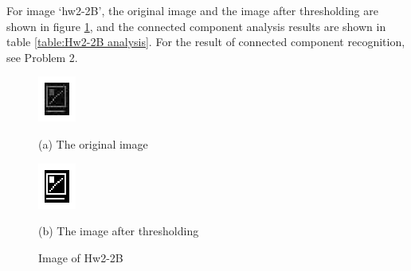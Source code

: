\documentclass[a4paper]{article}
\begin{document}
For image `hw2-2B', the original image and the image after thresholding are shown in figure \ref{figure:Hw2-2B image}, and the connected component analysis results are shown in table \ref{table:Hw2-2B analysis}. For the result of connected component recognition, see Problem 2. 
\begin{figure}[h]
	\begin{minipage}[c]{0.5\linewidth}
		\centering
		\includegraphics{program/1/figure/Hw2-2B.eps}
		\caption*{(a) The original image}
		\label{subfigure:Hw2-2B-original}
	\end{minipage}
	\begin{minipage}[c]{0.5\linewidth}
		\centering
		\includegraphics{program/1/figure/Hw2-2B-threshold.eps}
		\caption*{(b) The image after thresholding}
		\label{subfigure:Hw2-2B-threshold}
	\end{minipage}
	\caption{Image of Hw2-2B}\label{figure:Hw2-2B image}
\end{figure}
\end{document}
